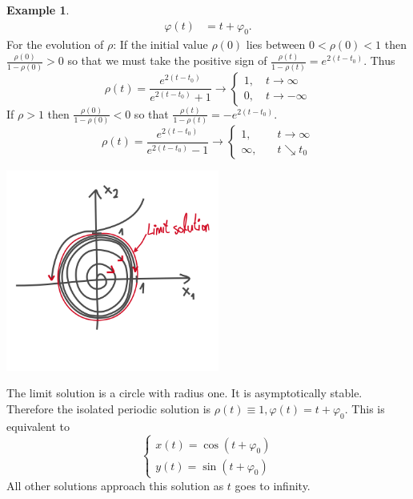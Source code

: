 \documentclass[hidelinks,a4paper, 11pt]{article}
\theoremstyle{plain}
\theoremstyle{break}
\theoremstyle{plain}
\theoremstyle{definition}
\newtheorem*{example}{Example}
\begin{document}
{\begin{example}
\begin{align*}
		\varphi(t)&  = t + \varphi_0 .
	\end{align*}
	For the evolution of $\rho$: If the initial value $\rho(0)$ lies between $0 < \rho(0) < 1$ then $\frac{\rho(0)}{1-\rho(0)} > 0$ so that we must take the positive sign of $\frac{\rho(t)}{1-\rho(t)} = e^{2(t-t_0)}$. Thus 
	\[
		\rho(t) = \frac{e^{2(t-t_0)}}{e^{2(t-t_0)} + 1} \to \begin{cases}
			1, \quad t \to \infty \\
			0, \quad t \to - \infty
		\end{cases}
	\]
	If $\rho > 1$ then $\frac{\rho(0)}{1-\rho(0)} <0$ so that $\frac{\rho(t)}{1-\rho(t)} = -e^{2(t-t_0)}$. 
	\[
		\rho(t) = \frac{e^{2(t-t_0)}}{e^{2(t-t_0)} -1} \to \begin{cases}
			1, \quad & t \to \infty \\
			\infty, \quad &t \searrow t_0
		\end{cases}
	\]
	\begin{center}
		\includegraphics[width=7cm]{limit_solution.png}
	\end{center}
The limit solution is a circle with radius one. It is asymptotically stable. Therefore the isolated periodic solution is $\rho(t) \equiv 1, \varphi(t) = t + \varphi_0$. This is equivalent to
\[
	\begin{cases}
		x(t) = \cos(t+\varphi_0) \\
		y(t) = \sin(t + \varphi_0)
	\end{cases}
\]
All other solutions approach this solution as $t$ goes to infinity.
\end{example}

}
\end{document}
